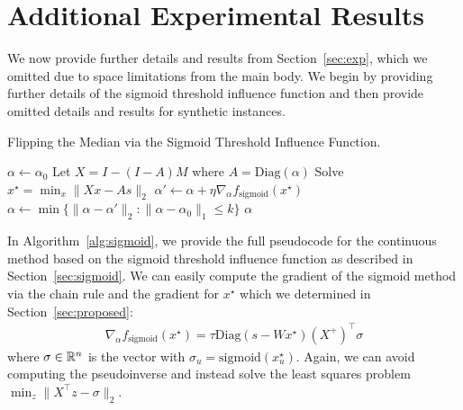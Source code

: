 

\section{Additional Experimental Results}

We now provide further details and results
from Section~\ref{sec:exp}, which we omitted
due to space limitations from the main body.
We begin by providing further details
of the sigmoid threshold influence function
and then provide omitted details
and results for synthetic instances.


\begin{algorithm}
\caption{Flipping the Median via the Sigmoid Threshold Influence Function.}
\label{alg:sigmoid}
\begin{algorithmic}[1]
    \State $\alpha \gets \alpha_0$
        \State Let $X = I - (I - A) M$ where $A = \mathrm{Diag}(\alpha)$
        \State Solve $x^\star = \min_x \|X x - A s \|_2$
        \State $\alpha' \gets \alpha + \eta \nabla_\alpha f_{\mathrm{sigmoid}}(x^\star)$
        \State $\alpha \gets \min \{ \|\alpha - \alpha'\|_2 :
            \|\alpha - \alpha_0\|_1 \le k \}$
    \EndWhile
    \State \Return $\alpha$
\EndFunction
\end{algorithmic}
\end{algorithm}

In Algorithm~\ref{alg:sigmoid},
we provide the full pseudocode for the
continuous method based on the sigmoid threshold
influence function
as described in Section~\ref{sec:sigmoid}.
We can easily compute
the gradient of the sigmoid method via
the chain rule and the gradient
for $x^\star$ which we determined in
Section~\ref{sec:proposed}:
\begin{align*}
    \nabla_{\alpha} f_{\mathrm{sigmoid}}(x^\star) = \tau \mathrm{Diag}(s - W x^\star)
    (X^+)^\top \sigma
\end{align*}
where $\sigma \in \mathbb{R}^{n}$
is the vector
with $\sigma_u = \mathrm{sigmoid}(x_u^\star)$.
Again, we can avoid computing
the pseudoinverse and instead
solve the least squares
problem $\min_z \| X^\top z - \sigma \|_2$.



